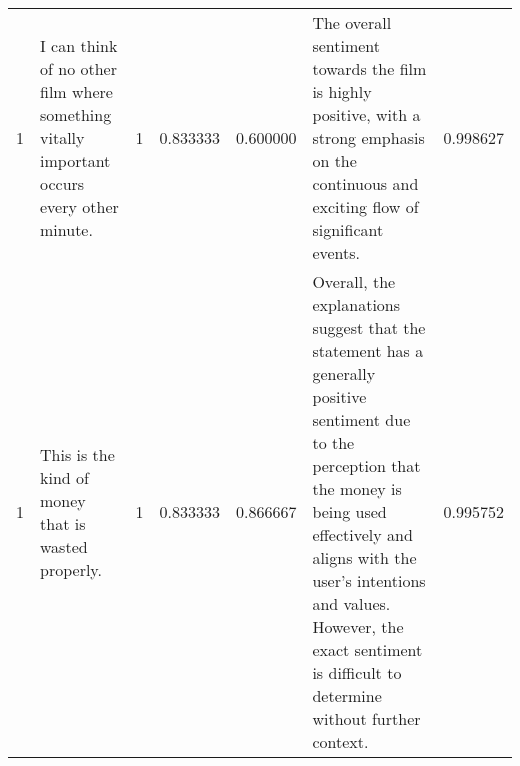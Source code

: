 \begin{tabular}{rlrrrlr}
1 & I can think of no other film where something vitally important occurs every other minute. & 1 & 0.833333 & 0.600000 & The overall sentiment towards the film is highly positive, with a strong emphasis on the continuous and exciting flow of significant events. & 0.998627 \\
1 & This is the kind of money that is wasted properly. & 1 & 0.833333 & 0.866667 & Overall, the explanations suggest that the statement has a generally positive sentiment due to the perception that the money is being used effectively and aligns with the user's intentions and values. However, the exact sentiment is difficult to determine without further context. & 0.995752 \\
\bottomrule
\end{tabular}
